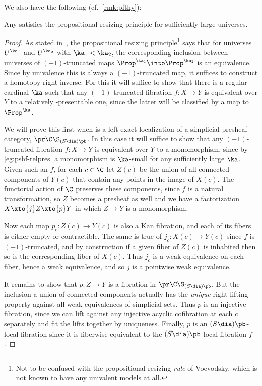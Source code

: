 We also have the following (cf.~\cref{rmk:pfthy}):

\begin{prop}\label{thm:propresizing}
  Any \ttmt satisfies the propositional resizing principle for sufficiently large universes.
\end{prop}
\begin{proof}
  As stated in~\cite[Axiom 3.5.5]{hottbook},
  the propositional resizing principle\footnote{Not to be confused with the propositional resizing \emph{rule} of Voevodsky, which is not known to have any univalent models at all.} says that for universes $U^{\ka_1}$ and $U^{\ka_2}$ with $\ka_1<\ka_2$, the corresponding inclusion between universes of $(-1)$-truncated maps $\Prop^{\ka_1}\into \Prop^{\ka_2}$ is an equivalence.
  Since by univalence this is always a $(-1)$-truncated map, it suffices to construct a homotopy right inverse.
  For this it will suffice to show that there is a regular cardinal $\ka$ such that any $(-1)$-truncated fibration $f:X\to Y$ is equivalent over $Y$ to a relatively \ka-presentable one, since the latter will be classified by a map to $\Prop^\ka$.

  We will prove this first when \E is a left exact localization of a simplicial presheaf category, $\pr\C\S_{(S\dia)\pb}$.
  In this case it will suffice to show that any $(-1)$-truncated fibration $f:X\to Y$ is equivalent over $Y$ to a monomorphism, since by \cref{eg:pshf-relpres} a monomorphism is $\ka$-small for any sufficiently large $\ka$.
  Given such an $f$, for each $c\in \C$ let $Z(c)$ be the union of all connected components of $Y(c)$ that contain any points in the image of $X(c)$.
  The functorial action of $\C$ preserves these components, since $f$ is a natural transformation, so $Z$ becomes a presheaf as well and we have a factorization $X \xto{j} Z \xto{p} Y$ in which $Z\to Y$ is a monomorphism.

  Now each map $p_c : Z(c) \to Y(c)$ is also a Kan fibration, and each of its fibers is either empty or contractible.
  The same is true of $j_c : X(c)\to Y(c)$ since $f$ is $(-1)$-truncated, and by construction if a given fiber of $Z(c)$ is inhabited then so is the corresponding fiber of $X(c)$.
  Thus $j_c$ is a weak equivalence on each fiber, hence a weak equivalence, and so $j$ is a pointwise weak equivalence.

  It remains to show that $p:Z\to Y$ is a fibration in $\pr\C\S_{(S\dia)\pb}$.
  But the inclusion a union of connected components actually has the \emph{unique} right lifting property against all weak equivalences of simplicial sets.
  Thus $p$ is an injective fibration, since we can lift against any injective acyclic cofibration at each $c$ separately and fit the lifts together by uniqueness.
  Finally, $p$ is an $(S\dia)\pb$-local fibration since it is fiberwise equivalent to the $(S\dia)\pb$-local fibration $f$.


\end{proof}
